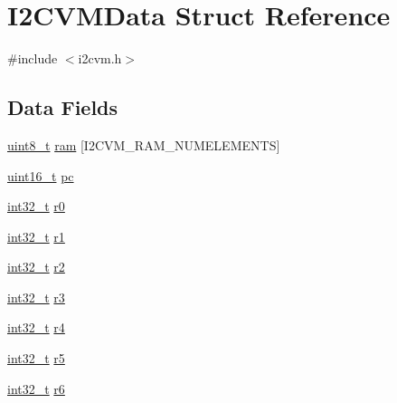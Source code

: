 \hypertarget{struct_i2_c_v_m_data}{\section{I2\-C\-V\-M\-Data Struct Reference}
\label{struct_i2_c_v_m_data}
}


{\ttfamily \#include $<$i2cvm.\-h$>$}

\subsection*{Data Fields}
\begin{DoxyCompactItemize}
\item 
\hyperlink{stdint_8h_aba7bc1797add20fe3efdf37ced1182c5}{uint8\-\_\-t} \hyperlink{struct_i2_c_v_m_data_aa78a321c590d3f7b5d503b948813c509}{ram} \mbox{[}I2\-C\-V\-M\-\_\-\-R\-A\-M\-\_\-\-N\-U\-M\-E\-L\-E\-M\-E\-N\-T\-S\mbox{]}
\item 
\hyperlink{stdint_8h_a273cf69d639a59973b6019625df33e30}{uint16\-\_\-t} \hyperlink{struct_i2_c_v_m_data_ab06e5a47a14e65556c2560ee7dce6e80}{pc}
\item 
\hyperlink{group___n_a_m_e_gafd12020da5a235dfcf0c3c748fb5baed}{int32\-\_\-t} \hyperlink{struct_i2_c_v_m_data_a57f3e029983539b73d8e3003fdb6dc4a}{r0}
\item 
\hyperlink{group___n_a_m_e_gafd12020da5a235dfcf0c3c748fb5baed}{int32\-\_\-t} \hyperlink{struct_i2_c_v_m_data_ae2818ce904b068618235b51a6c6d7e40}{r1}
\item 
\hyperlink{group___n_a_m_e_gafd12020da5a235dfcf0c3c748fb5baed}{int32\-\_\-t} \hyperlink{struct_i2_c_v_m_data_abd3898745367cbba7a19f3c0a5f47afc}{r2}
\item 
\hyperlink{group___n_a_m_e_gafd12020da5a235dfcf0c3c748fb5baed}{int32\-\_\-t} \hyperlink{struct_i2_c_v_m_data_a1d5b72045630c265b07c8e4e158bc9d6}{r3}
\item 
\hyperlink{group___n_a_m_e_gafd12020da5a235dfcf0c3c748fb5baed}{int32\-\_\-t} \hyperlink{struct_i2_c_v_m_data_a53ddf0fdf36d0e77d4573e671c87839d}{r4}
\item 
\hyperlink{group___n_a_m_e_gafd12020da5a235dfcf0c3c748fb5baed}{int32\-\_\-t} \hyperlink{struct_i2_c_v_m_data_a0cc4a4425c2f8d447a8629b6102db6d5}{r5}
\item 
\hyperlink{group___n_a_m_e_gafd12020da5a235dfcf0c3c748fb5baed}{int32\-\_\-t} \hyperlink{struct_i2_c_v_m_data_a44579b97441bc54acb0deed60dff7a1f}{r6}
\end{DoxyCompactItemize}


